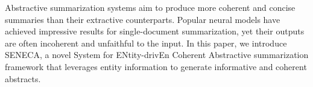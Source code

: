 Abstractive summarization systems aim to produce more coherent and concise summaries than their extractive counterparts. Popular neural models have achieved impressive results for single-document summarization, yet their outputs are often incoherent and unfaithful to the input. 
In this paper, we introduce SENECA, a novel System for ENtity-drivEn Coherent Abstractive summarization framework that leverages entity information to generate informative and coherent abstracts.
